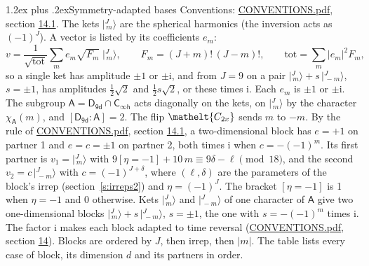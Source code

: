 \documentclass[10pt,a4paper]{article}
\makeatletter
\renewcommand\section{\@startsection{section}{1}{\z@}{-3ex plus -1ex minus -.2ex}%
  {1.2ex plus .2ex}{\normalfont\large\sffamily\bfseries\color{parttitle}}}
\numberwithin{equation}{section}
\newcommand{\eltfont}[1]{{\let\sigma\eltsigma\mathelt{#1}}}
\newcommand{\grp}[1]{\mathsf{#1}}
\newcommand{\elt}[1]{\eltfont{#1}}
\newcommand{\grpindex}[2]{[#1 : #2]}
\newcommand{\iverson}[1]{[#1]}
\newcommand{\iunit}{\mathrm{i}}
\newcommand{\chiA}{\chi_{\grp{A}}}
\newcommand{\jm}[2]{\bigl\lvert{}^{#1}_{\,#2}\bigr\rangle}
\makeatother
\begin{document}
\section{Symmetry-adapted bases}\label{s:bases}
Conventions: \href{../../CONVENTIONS.pdf}{CONVENTIONS.pdf}, section \href{../../CONVENTIONS.pdf\#conv.14.1}{14.1}.
\leavevmode\label{n:index.m}\label{n:vector.ket}The kets $\jm{J}{m}$ are the spherical harmonics (the inversion acts as $(-1)^J$). \label{n:index.ketcoefficient}\label{n:vector.basis.symmetry}\label{n:index.ketweight}\label{n:index.total}A vector is listed by its coefficients $e_m$:
\begin{equation}\label{e:ket}v = \frac{1}{\sqrt{\mathrm{tot}}}\sum_m e_m\sqrt{F_m}\;\jm{J}{m},\qquad F_m = (J+m)!\,(J-m)!,\qquad \mathrm{tot} = \sum_m |e_m|^2F_m,\end{equation}
\leavevmode\label{n:index.pair.sign}so a single ket has amplitude $\pm1$ or $\pm\iunit$, and from $J = 9$ on a pair $\jm{J}{m} + s\,\jm{J}{-m}$, $s = \pm1$, has amplitudes $\tfrac{1}{2}\sqrt{2}$ and $\tfrac{1}{2}s\sqrt{2}$, or these times $\iunit$. Each $e_m$ is $\pm1$ or $\pm\iunit$.
\leavevmode\label{n:group.A}\label{n:function.character.abelian}The subgroup $\grp{A} = \grp{D_{9d}}\cap\grp{C_{\infty h}}$ acts diagonally on the kets, on $\jm{J}{m}$ by the character $\chiA(m)$, and $\grpindex{\grp{D_{9d}}}{\grp{A}} = 2$. The flip $\elt{C_{2x}}$ sends $m$ to $-m$. \label{n:index.partner.sign}By the rule of \href{../../CONVENTIONS.pdf}{CONVENTIONS.pdf}, section \href{../../CONVENTIONS.pdf\#conv.14.1}{14.1}, a two-dimensional block has $e = +1$ on partner 1 and $e = c = \pm1$ on partner 2, both times $\iunit$ when $c = -(-1)^m$. \label{n:index.eta}Its first partner is $v_1 = \jm{J}{m}$ with $9\iverson{\eta = -1} + 10\,m \equiv 9\delta - \ell \pmod{18}$, and the second $v_2 = c\,\jm{J}{-m}$ with $c = (-1)^{J+\delta}$, where $(\ell, \delta)$ are the parameters of the block's irrep (section~\ref{s:irreps2}) and $\eta = (-1)^J$. The bracket $\iverson{\eta = -1}$ is 1 when $\eta = -1$ and 0 otherwise. Kets $\jm{J}{m}$ and $\jm{J}{-m}$ of one character of $\grp{A}$ give two one-dimensional blocks $\jm{J}{m} + s\,\jm{J}{-m}$, $s = \pm1$, the one with $s = -(-1)^m$ times $\iunit$. The factor $\iunit$ makes each block adapted to time reversal (\href{../../CONVENTIONS.pdf}{CONVENTIONS.pdf}, section \href{../../CONVENTIONS.pdf\#conv.14}{14}). Blocks are ordered by $J$, then irrep, then $|m|$.
\leavevmode\label{n:head.case}\label{n:head.partners}The table lists every case of block, its dimension $d$ and its partners in order.
\end{document}
